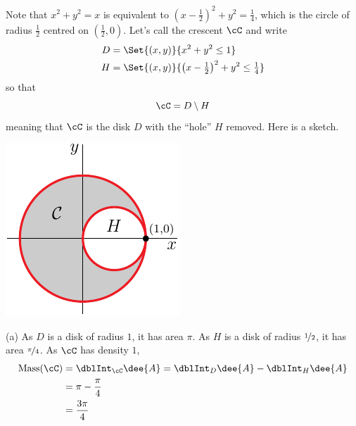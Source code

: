 \begin{solution}
Note that $x^2+y^2=x$ is equivalent to
$\left(x-\frac{1}{2}\right)^2+y^2=\frac{1}{4}$, which is the
circle of radius $\frac{1}{2}$ centred on $\left(\frac{1}{2},0\right)$.
Let's call the crescent $\cC$ and write
\begin{align*}
D &= \Set{(x,y)}{x^2+y^2\le 1} \\
H &= \Set{(x,y)}{\left(x-\tfrac{1}{2}\right)^2+y^2\le\tfrac{1}{4}}
\end{align*}
so that
\begin{equation*}
\cC= D\setminus H
\end{equation*}
meaning that $\cC$ is the disk $D$ with the ``hole'' $H$ removed.
Here is a sketch.

\begin{center}
     \includegraphics{fig/OE12D_8.pdf}
\end{center}

(a) As $D$ is a disk of radius $1$, it has area $\pi$.
    As $H$ is a disk of radius $\nicefrac{1}{2}$, it has 
           area $\nicefrac{\pi}{4}$.
As $\cC$ has density $1$, 
\begin{align*}
\text{Mass}(\cC) &= \dblInt_\cC \dee{A}
                  = \dblInt_D\dee{A} -\dblInt_H\dee{A} \\
   &=\pi - \frac{\pi}{4} \\
   &=\frac{3\pi}{4}
\end{align*}




\end{solution}
